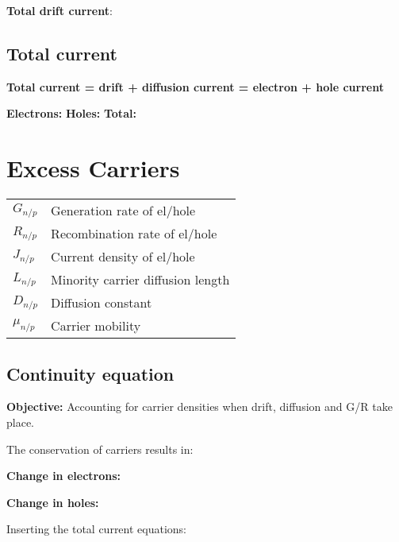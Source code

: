\documentclass[a4paper, fontsize=8pt, landscape, DIV=1]{scrartcl}
\begin{document}
\begin{multicols*}{4}
\textbf{Total drift current}:

\subsection{Total current}
\textbf{Total current = drift + diffusion current = electron + hole current}

\textbf{Electrons:} 
\textbf{Holes:} 
\textbf{Total:} 

  \section{Excess Carriers}
    \begin{tabular}[h]{l l}
      $G_{n/p}$   & Generation rate of el/hole \\
      $R_{n/p}$   & Recombination rate of el/hole \\
      $J_{n/p}$   & Current density of el/hole \\
      $L_{n/p}$   & Minority carrier diffusion length \\
      $D_{n/p}$   & Diffusion constant \\
      $\mu_{n/p}$ & Carrier mobility \\
    \end{tabular}

  \subsection{Continuity equation}
\textbf{Objective:} Accounting for carrier densities when drift, diffusion and G/R take place. 

The conservation of carriers results in:

\textbf{Change in electrons:}

\textbf{Change in holes:}

Inserting the total current equations:


\end{multicols*}
\end{document}
